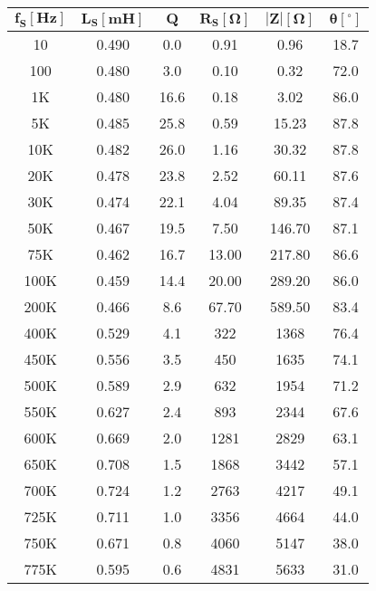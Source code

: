  

 \begin{center}
     \begin{table}[H]
     \centering
     \renewcommand{\arraystretch}{1.1}
         \begin{tabular}{ c c c c c c }
            \hline 
             $\bm{f_S[Hz]}$ &  $\bm{L_S[mH]}$ & $\bm{Q}$& $\bm{R_S[\Omega]}$ & $\bm{|Z|[\Omega]}$ & $\bm{\theta}[^\circ]$ \\
             \hline
                10		& 0.490        & 0.0    & 0.91 		& 0.96  & 18.7   \\
				100 	& 0.480       & 3.0   	 & 0.10  	& 0.32  & 72.0     \\
				1K    & 0.480         & 16.6	& 0.18 		& 3.02  & 86.0     \\
				5K    & 0.485        & 25.8 	& 0.59		 & 15.23 & 87.8   \\
				10K   & 0.482        & 26.0     & 1.16 		& 30.32 & 87.8   \\
				20K   & 0.478       & 23.8 		& 2.52 		& 60.11 & 87.6   \\
				30K   & 0.474       & 22.1 		& 4.04 		& 89.35 & 87.4  \\
				50K   & 0.467        & 19.5		 & 7.50 		 & 146.70 & 87.1  \\
				75K   & 0.462       & 16.7 		& 13.00   	& 217.80 & 86.6  \\
				100K  & 0.459       & 14.4 		& 20.00  	 & 289.20 & 86.0   \\
				200K  & 0.466       & 8.6  		& 67.70 	& 589.50 & 83.4    \\
				400K  & 0.529        & 4.1 		 & 322 		 & 1368  & 76.4   \\
				450K  & 0.556        & 3.5 		 & 450  	& 1635  & 74.1   \\
				500K  & 0.589        & 2.9 		 & 632 		 & 1954  & 71.2  \\
				550K  & 0.627        & 2.4  	& 893  		& 2344  & 67.6    \\
				600K  & 0.669        & 2.0    & 1281 		& 2829  & 63.1   \\
				650K  & 0.708        & 1.5 		 & 1868 	& 3442  & 57.1    \\
				700K  & 0.724       & 1.2  		& 2763 		& 4217  & 49.1    \\
				725K  & 0.711        & 1.0  	  & 3356	 & 4664  & 44.0    \\
				750K  & 0.671       & 0.8 		 & 4060 	& 5147  & 38.0    \\
				775K  & 0.595       & 0.6 		 & 4831 	& 5633  & 31.0       \\

\end{tabular}
\end{table}
\end{center}
